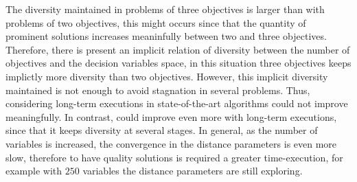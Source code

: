 The diversity maintained in problems of three objectives is larger than with problems of two objectives, this might occurs since that the quantity of prominent solutions increases meaninfully between two and three objectives.
%
Therefore, there is present an implicit relation of diversity between the number of objectives and the decision variables space, in this situation three objectives keeps implictly more diversity than two objectives.
%
However, this implicit diversity maintained is not enough to avoid stagnation in several problems.
%
Thus, considering long-term executions in state-of-the-art algorithms could not improve meaningfully.
%
In contrast, \VSDMOEA{} could improve even more with long-term executions, since that it keeps diversity at several stages.
%
In general, as the number of variables is increased, the convergence in the distance parameters is even more slow, therefore to have quality solutions is required a greater time-execution, for example with $250$ variables the distance parameters are still exploring.
%

%
%
%
%
%
%
%
%
%
%

%

